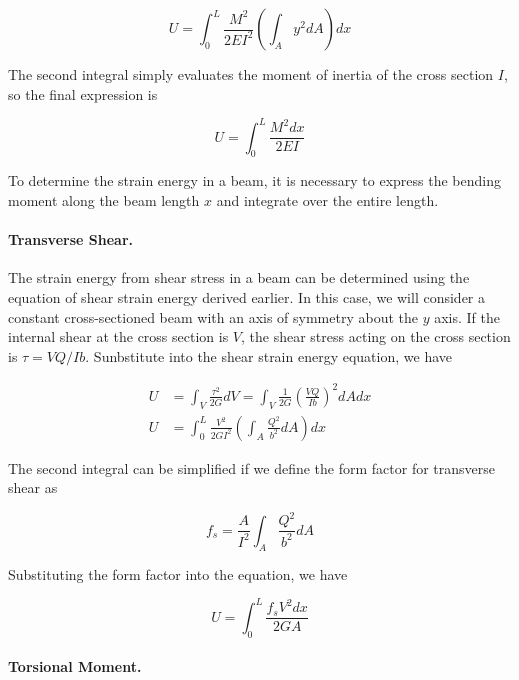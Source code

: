 \documentclass[
10pt,
a4paper,
openany,
svgnames,
]{book} %
\begin{document}
\begin{equation*}
  U = \int_0^L \frac{M^2}{2EI^2} \left( \int_A y^2 dA \right) dx
\end{equation*}

The second integral simply evaluates the moment of inertia of the cross section $I$, so the final expression is

\begin{equation}
  U = \int_0^L \frac{M^2dx}{2EI}
\end{equation}

To determine the strain energy in a beam, it is necessary to express the bending moment along the beam length $x$ and integrate over the entire length.

\paragraph{Transverse Shear.}

The strain energy from shear stress in a beam can be determined using the equation of shear strain energy derived earlier. In this case, we will consider a constant cross-sectioned beam with an axis of symmetry about the $y$ axis. If the internal shear at the cross section is $V$, the shear stress acting on the cross section is $\tau = VQ/Ib$. Sunbstitute into the shear strain energy equation, we have

\begin{align*}
  U &= \int_V \frac{\tau^2}{2G} dV = \int_V \frac{1}{2G} \left( \frac{VQ}{Ib} \right)^2 dA dx \\
  U &= \int_0^L \frac{V^2}{2GI^2} \left( \int_A \frac{Q^2}{b^2} dA \right) dx
\end{align*}

The second integral can be simplified if we define the form factor for transverse shear as

\begin{equation}
  f_s = \frac{A}{I^2} \int_A \frac{Q^2}{b^2} dA
\end{equation}

Substituting the form factor into the equation, we have

\begin{equation}
  U = \int_0^L \frac{f_s V^2 dx}{2GA}
\end{equation}

\paragraph{Torsional Moment.}
\end{document}
